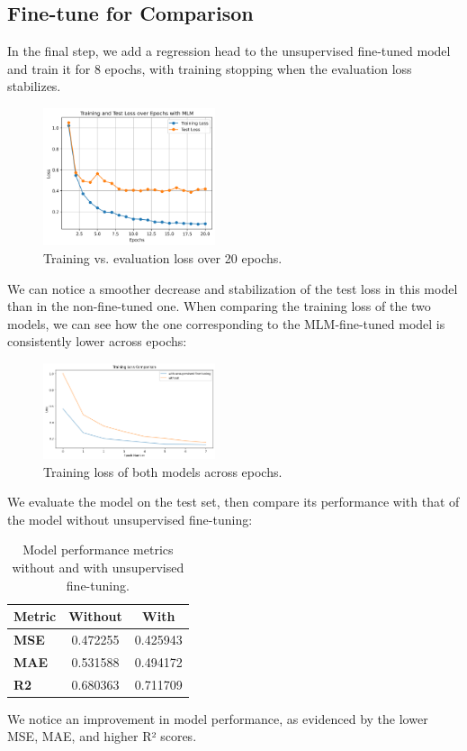 \documentclass[11pt]{article}
\begin{document}
\subsection{Fine-tune for Comparison}
In the final step, we add a regression head to the unsupervised fine-tuned model and train it for 8 epochs, with training stopping when the evaluation loss stabilizes.
\begin{figure}[ht]
  \centering
  \includegraphics[width=0.45\textwidth]{images/1.training_loss_plot_mlm.png}
  \caption{Training vs. evaluation loss over 20 epochs.}
  \label{fig:results}
\end{figure}
We can notice a smoother decrease and stabilization of the test loss in this model than in the non-fine-tuned one.
When comparing the training loss of the two models, we can see how the one corresponding to the MLM-fine-tuned model is consistently lower across epochs:
\begin{figure}[ht]
  \centering
  \includegraphics[width=0.45\textwidth]{images/1.training_loss_comparison.png}
  \caption{Training loss of both models across epochs.}
  \label{fig:results}
\end{figure}
We evaluate the model on the test set, then compare its performance with that of the model without unsupervised fine-tuning:
\begin{table}[ht]
\centering
\begin{tabular}{lcc}
\hline
\textbf{Metric} & \textbf{Without} & \textbf{With} \\
\hline
\textbf{MSE} & 0.472255 & 0.425943 \\
\textbf{MAE} & 0.531588 & 0.494172 \\
\textbf{R2}  & 0.680363 & 0.711709 \\
\hline
\end{tabular}
\caption{Model performance metrics without and with unsupervised fine-tuning.}
\label{tab:metrics_comparison}
\end{table}
We notice an improvement in model performance, as evidenced by the lower MSE, MAE, and higher R² scores.
\end{document}
